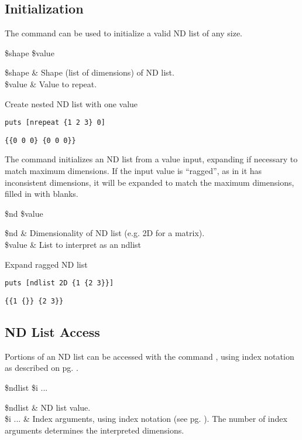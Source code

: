 \documentclass{article}
\begin{document}
\clearpage
\subsection{Initialization}
The command  can be used to initialize a valid ND list of any size.
\begin{syntax}
 \$shape \$value
\end{syntax}
\begin{args}
\$shape & Shape (list of dimensions) of ND list. \\
\$value & Value to repeat.
\end{args}
\begin{example}{Create nested ND list with one value}
\begin{lstlisting}
puts [nrepeat {1 2 3} 0]
\end{lstlisting}
\tcblower
\begin{lstlisting}
{{0 0 0} {0 0 0}}
\end{lstlisting}
\end{example}

The command  initializes an ND list from a value input, expanding if necessary to match maximum dimensions.
If the input value is ``ragged'', as in it has inconsistent dimensions, it will be expanded to match the maximum dimensions, filled in with blanks.
\begin{syntax}
 \$nd \$value
\end{syntax}
\begin{args}
\$nd & Dimensionality of ND list (e.g. 2D for a matrix).  \\
\$value & List to interpret as an ndlist
\end{args}
\begin{example}{Expand ragged ND list}
\begin{lstlisting}
puts [ndlist 2D {1 {2 3}}]
\end{lstlisting}
\tcblower
\begin{lstlisting}
{{1 {}} {2 3}}
\end{lstlisting}
\end{example}

\clearpage

\subsection{ND List Access}
Portions of an ND list can be accessed with the command , using index notation as described on pg. \pageref{indexformat}. 
\begin{syntax}
 \$ndlist \$i ...
\end{syntax}
\begin{args}
\$ndlist & ND list value. \\
\$i ... & Index arguments, using index notation (see pg. \pageref{indexformat}). The number of index arguments determines the interpreted dimensions.
\end{args}
\end{document}
